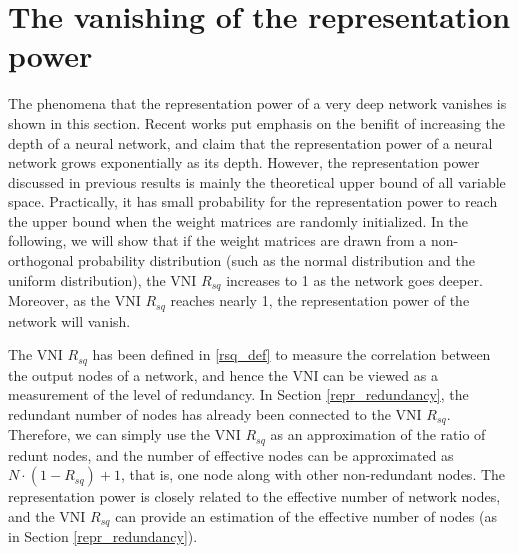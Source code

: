 \fi


\section{The vanishing of the representation power} \label{repr_general}

The phenomena that the representation power of a very deep network vanishes
is shown in this section.
Recent works \cite{mft:expo, expressive, linear_regions, expr_power, relu_understand,
relu_benifit, relu_approx} put emphasis on the benifit of increasing the depth of a neural network,
and claim that the representation power of a neural network grows exponentially as its depth. 
However, the representation power discussed in previous results is mainly the theoretical upper bound of
all variable space.
Practically, it has small probability for the representation power to reach the upper bound when
the weight matrices are randomly initialized.
In the following, we will show that if the weight matrices are drawn from a non-orthogonal
probability distribution (such as the normal distribution and the uniform distribution), the VNI
$R_{sq}$ increases to 1 as the network goes deeper. Moreover, as the VNI $R_{sq}$ reaches nearly 1,
the representation power of the network will vanish.

The VNI $R_{sq}$ has been defined in \eqref{rsq_def} to measure the correlation between the output nodes of
a network, and hence the VNI can be viewed as a measurement of the level of redundancy.
In Section \ref{repr_redundancy}, the redundant number of nodes has already been connected to the
VNI $R_{sq}$. Therefore, we can simply use the VNI $R_{sq}$ as an approximation of the ratio of redunt
nodes, and the number of effective nodes can be approximated as $N\cdot(1-R_{sq})+1$, that is,
one node along with other non-redundant nodes.
The representation power is closely related to the effective number of network nodes, and the VNI
$R_{sq}$ can provide an estimation of the effective number of nodes
(as in Section \ref{repr_redundancy}).
 
